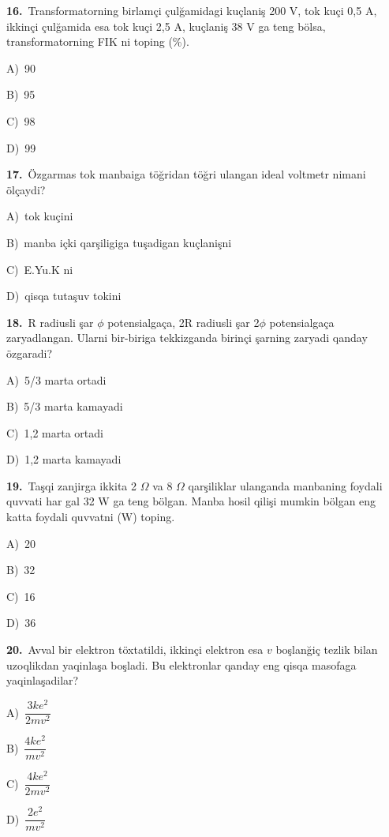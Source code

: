 \documentclass[11pt,a4paper]{article}
\newcommand{\opt}[2]{\hspace*{4mm}#1)\ #2\par}
\begin{document}
\noindent\begin{minipage}{\linewidth}
\textbf{16.}\ Transformatorning birlamçi çulğamidagi kuçlaniş 200 V, tok kuçi 0,5 A, ikkinçi çulğamida esa tok kuçi 2,5 A, kuçlaniş 38 V ga teng bölsa, transformatorning FIK ni toping (\%).\par\smallskip
\opt{A}{90}
\opt{B}{95}
\opt{C}{98}
\opt{D}{99}
\end{minipage}\vspace{9pt}\par
\noindent\begin{minipage}{\linewidth}
\textbf{17.}\ Özgarmas tok manbaiga töğridan töğri ulangan ideal voltmetr nimani ölçaydi?\par\smallskip
\opt{A}{tok kuçini}
\opt{B}{manba içki qarşiligiga tuşadigan kuçlanişni}
\opt{C}{E.Yu.K ni}
\opt{D}{qisqa tutaşuv tokini}
\end{minipage}\vspace{9pt}\par
\noindent\begin{minipage}{\linewidth}
\textbf{18.}\ R radiusli şar $\phi$ potensialgaça, 2R radiusli şar 2$\phi$ potensialgaça zaryadlangan. Ularni bir-biriga tekkizganda birinçi şarning zaryadi qanday özgaradi?\par\smallskip
\opt{A}{5/3 marta ortadi}
\opt{B}{5/3 marta kamayadi}
\opt{C}{1,2 marta ortadi}
\opt{D}{1,2 marta kamayadi}
\end{minipage}\vspace{9pt}\par
\noindent\begin{minipage}{\linewidth}
\textbf{19.}\ Taşqi zanjirga ikkita 2 $\Omega$ va 8 $\Omega$ qarşiliklar ulanganda manbaning foydali quvvati har gal 32 W ga teng bölgan. Manba hosil qilişi mumkin bölgan eng katta foydali quvvatni (W) toping.\par\smallskip
\opt{A}{20}
\opt{B}{32}
\opt{C}{16}
\opt{D}{36}
\end{minipage}\vspace{9pt}\par
\noindent\begin{minipage}{\linewidth}
\textbf{20.}\ Avval bir elektron töxtatildi, ikkinçi elektron esa $v$ boşlanğiç tezlik bilan uzoqlikdan yaqinlaşa boşladi. Bu elektronlar qanday eng qisqa masofaga yaqinlaşadilar?\par\smallskip
\opt{A}{$\dfrac{3ke^2}{2mv^2}$}
\opt{B}{$\dfrac{4ke^2}{mv^2}$}
\opt{C}{$\dfrac{4ke^2}{2mv^2}$}
\opt{D}{$\dfrac{2e^2}{mv^2}$}
\end{minipage}\vspace{9pt}\par
\end{document}
